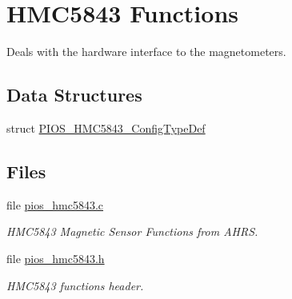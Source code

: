 \hypertarget{group___p_i_o_s___h_m_c5843}{\section{\-H\-M\-C5843 \-Functions}
\label{group___p_i_o_s___h_m_c5843}
}


\-Deals with the hardware interface to the magnetometers.  


\subsection*{\-Data \-Structures}
\begin{DoxyCompactItemize}
\item 
struct \hyperlink{struct_p_i_o_s___h_m_c5843___config_type_def}{\-P\-I\-O\-S\-\_\-\-H\-M\-C5843\-\_\-\-Config\-Type\-Def}
\end{DoxyCompactItemize}
\subsection*{\-Files}
\begin{DoxyCompactItemize}
\item 
file \hyperlink{pios__hmc5843_8c}{pios\-\_\-hmc5843.\-c}
\begin{DoxyCompactList}\small\item\em \-H\-M\-C5843 \-Magnetic \-Sensor \-Functions from \-A\-H\-R\-S. \end{DoxyCompactList}\item 
file \hyperlink{pios__hmc5843_8h}{pios\-\_\-hmc5843.\-h}
\begin{DoxyCompactList}\small\item\em \-H\-M\-C5843 functions header. \end{DoxyCompactList}\end{DoxyCompactItemize}

